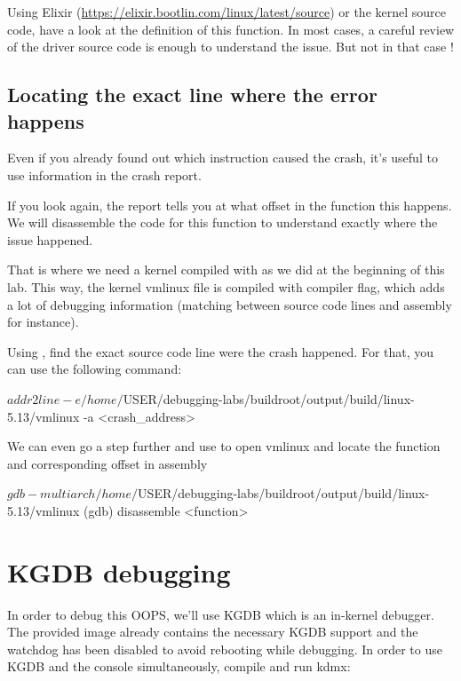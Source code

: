 Using Elixir (\url{https://elixir.bootlin.com/linux/latest/source}) or the
kernel source code, have a look at the definition of this function. In most
cases, a careful review of the driver source code is enough to understand the
issue. But not in that case !

\subsection{Locating the exact line where the error happens}

Even if you already found out which instruction caused the crash, it's
useful to use information in the crash report.

If you look again, the report tells you at what offset in the function
this happens. We will disassemble the code for this function to understand
exactly where the issue happened.

That is where we need a kernel compiled with 
as we did at the beginning of this lab. This way, the kernel vmlinux file is
compiled with  compiler flag, which adds a lot of debugging
information (matching between source code lines and assembly for instance).

Using , find the exact source code line were the crash happened.
For that, you can use the following command:

\begin{bashinput}
$ addr2line -e /home/$USER/debugging-labs/buildroot/output/build/linux-5.13/vmlinux
  -a <crash_address>
\end{bashinput}

We can even go a step further and use  to open vmlinux and
locate the function and corresponding offset in assembly

\begin{bashinput}
$ gdb-multiarch /home/$USER/debugging-labs/buildroot/output/build/linux-5.13/vmlinux
(gdb) disassemble <function>
\end{bashinput}

\section{KGDB debugging}
In order to debug this OOPS, we'll use KGDB which is an in-kernel debugger.
The provided image already contains the necessary KGDB support and the watchdog
has been disabled to avoid rebooting while debugging. In order to use KGDB and
the console simultaneously, compile and run kdmx:

